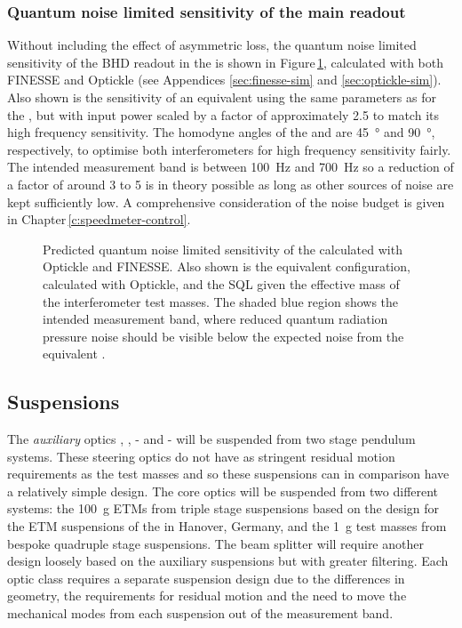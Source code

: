 \subsubsection{Quantum noise limited sensitivity of the main readout}
Without including the effect of asymmetric loss, the quantum noise limited sensitivity of the \gls{BHD} readout in the \SSMEXPT{} is shown in Figure\,\ref{fig:erc-ssm-qnls}, calculated with both \gls{FINESSE} and Optickle (see Appendices \ref{sec:finesse-sim} and \ref{sec:optickle-sim}). Also shown is the sensitivity of an equivalent \FPMI{} using the same parameters as for the \SSM{}, but with input power scaled by a factor of approximately \num{2.5} to match its high frequency sensitivity. The homodyne angles of the \SSM{} and \MI{} are \SI{45}{\degree} and \SI{90}{\degree}, respectively, to optimise both interferometers for high frequency sensitivity fairly. The intended measurement band is between \SI{100}{\hertz} and \SI{700}{\hertz} so a reduction of a factor of around \num{3} to \num{5} is in theory possible as long as other sources of noise are kept sufficiently low. A comprehensive consideration of the noise budget is given in Chapter\,\ref{c:speedmeter-control}.

\begin{figure}
  \centering
  
  \caption[Predicted quantum noise limited sensitivity of the \SSMEXPT{}]{\label{fig:erc-ssm-qnls}Predicted quantum noise limited sensitivity of the \SSMEXPT{} calculated with Optickle and \gls{FINESSE}. Also shown is the equivalent \FPMI{} configuration, calculated with Optickle, and the \gls{SQL} given the effective mass of the interferometer test masses. The shaded blue region shows the intended measurement band, where reduced quantum radiation pressure noise should be visible below the expected noise from the equivalent \FPMI{}.}
\end{figure}

\subsection{Suspensions}
The \emph{auxiliary} optics \MFOUR{}, \MFIVE{}, \MSEVEN{}-\MTEN{} and \MTWELVE{}-\MFIFTEEN{} will be suspended from two stage pendulum systems. These steering optics do not have as stringent residual motion requirements as the test masses and so these suspensions can in comparison have a relatively simple design. The core optics will be suspended from two different systems: the \SI{100}{\gram} \glspl{ETM} from triple stage suspensions based on the design for the \gls{ETM} suspensions of the \AEIPROTOTYPE{} in Hanover, Germany, and the \SI{1}{\gram} test masses from bespoke quadruple stage suspensions. The beam splitter \MSIX{} will require another design loosely based on the auxiliary suspensions but with greater filtering. Each optic class requires a separate suspension design due to the differences in geometry, the requirements for residual motion and the need to move the mechanical modes from each suspension out of the measurement band.

